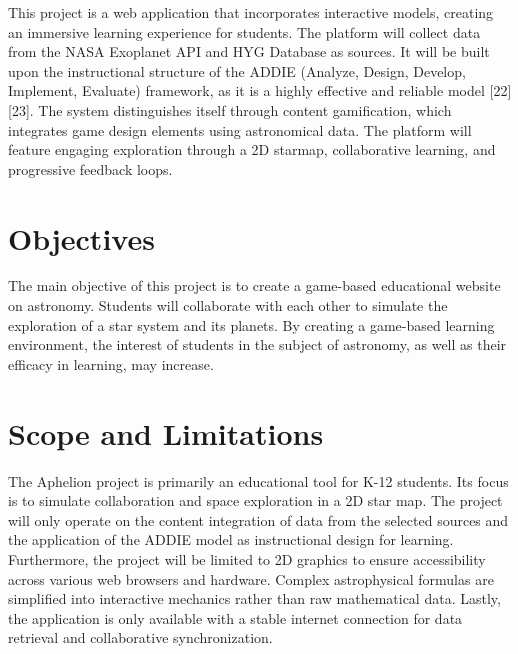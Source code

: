 This project is a web application that incorporates interactive models, creating an immersive learning experience for students. 
The platform will collect data from the NASA Exoplanet API and HYG Database as sources. It will be built upon the instructional 
structure of the ADDIE (Analyze, Design, Develop, Implement, Evaluate) framework, as it is a highly effective and reliable model 
[22][23]. The system distinguishes itself through content gamification, which integrates game design elements using astronomical data. 
The platform will feature engaging exploration through a 2D starmap, collaborative learning, and progressive feedback loops.


\section{Objectives}

The main objective of this project is to create a game-based educational website on astronomy. Students will collaborate with 
each other to simulate the exploration of a star system and its planets. By creating a game-based learning environment, the interest 
of students in the subject of astronomy, as well as their efficacy in learning, may increase.

\section{Scope and Limitations}

The Aphelion project is primarily an educational tool for K-12 students. Its focus is to simulate collaboration and space exploration in 
a 2D star map. The project will only operate on the content integration of data from the selected sources and the application of the 
ADDIE model as instructional design for learning. Furthermore, the project will be limited to 2D graphics to ensure accessibility across 
various web browsers and hardware. Complex astrophysical formulas are simplified into interactive mechanics rather than raw mathematical 
data. Lastly, the application is only available with a stable internet connection for data retrieval and collaborative synchronization. 
